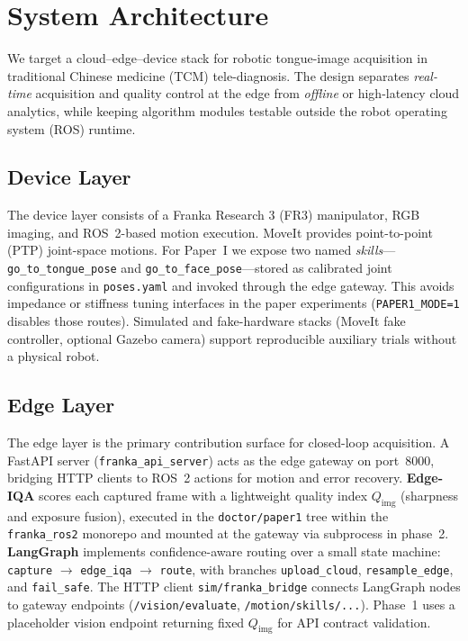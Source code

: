 \section{System Architecture}
\label{sec:system}

We target a cloud--edge--device stack for robotic tongue-image acquisition in traditional Chinese medicine (TCM) tele-diagnosis.
The design separates \emph{real-time} acquisition and quality control at the edge from \emph{offline} or high-latency cloud analytics, while keeping algorithm modules testable outside the robot operating system (ROS) runtime.

\subsection{Device Layer}
The device layer consists of a Franka Research 3 (FR3) manipulator, RGB imaging, and ROS~2-based motion execution.
MoveIt provides point-to-point (PTP) joint-space motions.
For Paper~I we expose two named \emph{skills}---\texttt{go\_to\_tongue\_pose} and \texttt{go\_to\_face\_pose}---stored as calibrated joint configurations in \texttt{poses.yaml} and invoked through the edge gateway.
This avoids impedance or stiffness tuning interfaces in the paper experiments (\texttt{PAPER1\_MODE=1} disables those routes).
Simulated and fake-hardware stacks (MoveIt fake controller, optional Gazebo camera) support reproducible auxiliary trials without a physical robot.

\subsection{Edge Layer}
The edge layer is the primary contribution surface for closed-loop acquisition.
A FastAPI server (\texttt{franka\_api\_server}) acts as the edge gateway on port~8000, bridging HTTP clients to ROS~2 actions for motion and error recovery.
\textbf{Edge-IQA} scores each captured frame with a lightweight quality index $Q_{\mathrm{img}}$ (sharpness and exposure fusion), executed in the \texttt{doctor/paper1} tree within the \texttt{franka\_ros2} monorepo and mounted at the gateway via subprocess in phase~2.
\textbf{LangGraph} implements confidence-aware routing over a small state machine: \texttt{capture} $\rightarrow$ \texttt{edge\_iqa} $\rightarrow$ \texttt{route}, with branches \texttt{upload\_cloud}, \texttt{resample\_edge}, and \texttt{fail\_safe}.
The HTTP client \texttt{sim/franka\_bridge} connects LangGraph nodes to gateway endpoints (\texttt{/vision/evaluate}, \texttt{/motion/skills/...}).
Phase~1 uses a placeholder vision endpoint returning fixed $Q_{\mathrm{img}}$ for API contract validation.

